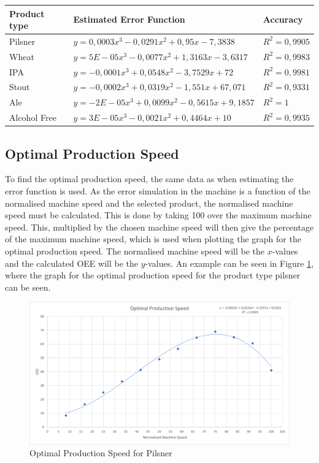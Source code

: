 \begin{table}[ht]
     \begin{tabularx}{\textwidth}{|>{\RaggedRight}p{3cm}|>{\RaggedRight}X|>{\RaggedRight}p{3cm}|}
     \hline
     \textbf{Product type} & \textbf{Estimated Error Function} & \textbf{Accuracy} \\
     \hline
     Pilsner & \(y = 0,0003x^3 - 0,0291x^2 + 0,95x - 7,3838\) & \(R^2 = 0,9905\) \\
     \hline
     Wheat & \(y = 5E-05x^3 - 0,0077x^2 + 1,3163x - 3,6317\) & \(R^2 = 0,9983\) \\
     \hline
     IPA & \(y = -0,0001x^3 + 0,0548x^2 - 3,7529x + 72\) & \(R^2 = 0,9981\) \\
     \hline
     Stout & \(y = -0,0002x^3 + 0,0319x^2 - 1,551x + 67,071\) & \(R^2 = 0,9331\) \\
     \hline
     Ale & \(y = -2E-05x^3 + 0,0099x^2 - 0,5615x + 9,1857\) & \(R^2 = 1\) \\
     \hline
     Alcohol Free & \(y = 3E-05x^3 - 0,0021x^2 + 0,4464x + 10\) & \(R^2 = 0,9935\) \\
     \hline
    \end{tabularx}
    \label{table:eef}
\end{table}

\subsection{Optimal Production Speed}
To find the optimal production speed, the same data as when estimating the error
function is used. As the error simulation in the machine is a function of the
normalised machine speed and the selected product, the normalised machine speed
must be calculated. This is done by taking 100 over the maximum machine speed.
This, multiplied by the chosen machine speed will then give the percentage of
the maximum machine speed, which is used when plotting the graph for the optimal
production speed. The normalised machine speed will be the \(x\)-values and the
calculated OEE will be the \(y\)-values. An example can be seen in Figure
\ref{figure:ops_pilsner}, where the graph for the optimal production speed for
the product type pilsner can be seen.

\begin{figure}[ht]
	\centering
	\includegraphics[width=1\linewidth]{images/ops/pilsner.png}
	\caption{Optimal Production Speed for Pilsner}
	\label{figure:ops_pilsner}
\end{figure}

